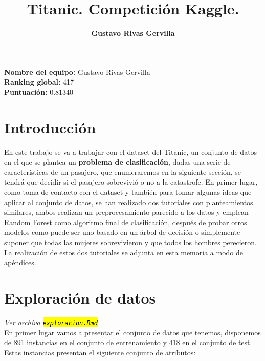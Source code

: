 \documentclass[10pt,a4paper]{article}
\author{\textbf{Gustavo Rivas Gervilla}}
\title{\textcolor{deepblue}{\textbf{Titanic. Competición Kaggle.}}}
\date{}
\newcommand{\archive}[1]{\sethlcolor{light-blue}\hl{\texttt{#1}}} %
\begin{document}
\maketitle

\begin{center}
  \textbf{Nombre del equipo: }Gustavo Rivas Gervilla\\
  \textbf{Ranking global: }417\\
  \textbf{Puntuación: }0.81340
\end{center}

\newpage

\tableofcontents

\newpage

\section{Introducción}

En este trabajo se va a trabajar con el dataset del Titanic, un conjunto de datos en el que se plantea un \textbf{problema de clasificación}, dadas una serie de características de un pasajero, que enumeraremos en la siguiente sección, se tendrá que decidir si el pasajero sobrevivió o no a la catastrofe. En primer lugar, como toma de contacto con el dataset y también para tomar algunas ideas que aplicar al conjunto de datos, se han realizado dos tutoriales con planteamientos similares, ambos realizan un preprocesamiento parecido a los datos y emplean Random Forest como algoritmo final de clasificación, después de probar otros modelos como puede ser uno basado en un árbol de decisión o simplemente suponer que todas las mujeres sobrevivieron y que todos los hombres perecieron. La realización de estos dos tutoriales se adjunta en esta memoria a modo de apéndices.\\

\section{Exploración de datos} \emph{Ver archivo \archive{exploracion.Rmd}}\\

En primer lugar vamos a presentar el conjunto de datos que tenemos, disponemos de 891 instancias en el conjunto de entrenamiento y 418 en el conjunto de test. Estas instancias presentan el siguiente conjunto de atributos:
\end{document}
